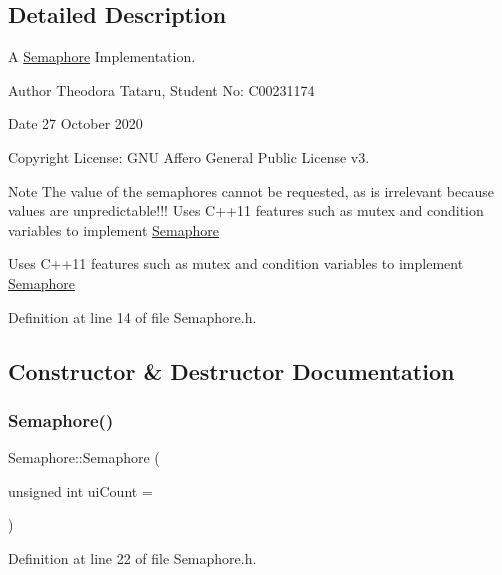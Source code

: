 \subsection{Detailed Description}
A \hyperlink{class_semaphore}{Semaphore} Implementation. 

\begin{DoxyAuthor}{Author}
Theodora Tataru, Student No\+: C00231174~\newline
 
\end{DoxyAuthor}
\begin{DoxyDate}{Date}
27 October 2020 
\end{DoxyDate}
\begin{DoxyCopyright}{Copyright}
License\+: G\+NU Affero General Public License v3.
\end{DoxyCopyright}
\begin{DoxyNote}{Note}
The value of the semaphores cannot be requested, as is irrelevant because values are unpredictable!!! Uses C++11 features such as mutex and condition variables to implement \hyperlink{class_semaphore}{Semaphore}
\end{DoxyNote}
Uses C++11 features such as mutex and condition variables to implement \hyperlink{class_semaphore}{Semaphore} 

Definition at line 14 of file Semaphore.\+h.



\subsection{Constructor \& Destructor Documentation}
\mbox{\label{class_semaphore_a0d9290d316636875ca85d1d78950a817}} 
\subsubsection{\texorpdfstring{Semaphore()}{Semaphore()}}
{\footnotesize\ttfamily Semaphore\+::\+Semaphore (\begin{DoxyParamCaption}\item[{unsigned int}]{ui\+Count = {} }\end{DoxyParamCaption})\hspace{0.3cm}{\ttfamily [inline]}}



Definition at line 22 of file Semaphore.\+h.



